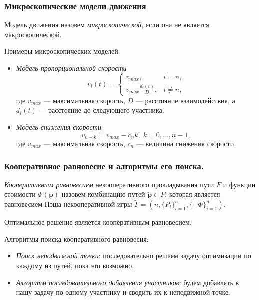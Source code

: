 \documentclass{beamer}
\begin{document}
\begin{frame}\frametitle{Микроскопические модели движения}
	 Модель движения назовем \textit{микроскопической}, если она не является макроскопической.
	
	\bigskip
	Примеры микроскопических моделей:
	\begin{itemize}
		\item \textit{Модель пропорциональной скорости}
		\begin{equation}
			\label{eq:micro}
			v_i(t)=
			\begin{cases}
				v_{max}, & i = n,
				\\
				v_{max} \frac{d_i(t)}{D} ,& i \ne n,
			\end{cases}
		\end{equation}
	где $v_{max}$ --- максимальная скорость, $D$ --- расстояние взаимодействия, а $d_i(t)$ --- расстояние до следующего участника.
	
	\item \textit{Модель снижения скорости}
	\begin{equation}
		v_{n - k} = v_{max} - c_n k, \; k = 0, \dots, n - 1,
	\end{equation}
	где $v_{max}$ --- максимальная скорость, $c_n$ --- величина снижения скорости.
	
	\end{itemize}
\end{frame}

\begin{frame}\frametitle{Кооперативное равновесие и алгоритмы его поиска.}
\textit{Кооперативным равновесием} некооперативного прокладывания пути $F$ и функции стоимости $\Phi (\textbf{p})$ назовем комбинацию путей $\widetilde{\textbf{p}} \in P$, которая является равновесием Нэша некооперативной игры $\widetilde{\Gamma} = (n, \{P_i\}_{i = 1}^n, \{-\Phi\}_{i = 1}^n)$.

Оптимальное решение является кооперативным равновесием.

\bigskip
Алгоритмы поиска кооперативного равновесия:
\begin{itemize}
	\item \textit{Поиск неподвижной точки}: последовательно решаем задачу оптимизации по каждому из путей, пока это возможно. 
	\item  \textit{Алгоритм последовательного добавления участников}: будем добавлять в нашу задачу по одному участнику и сводить их к неподвижной точке.
\end{itemize}
\end{frame}
\end{document}

